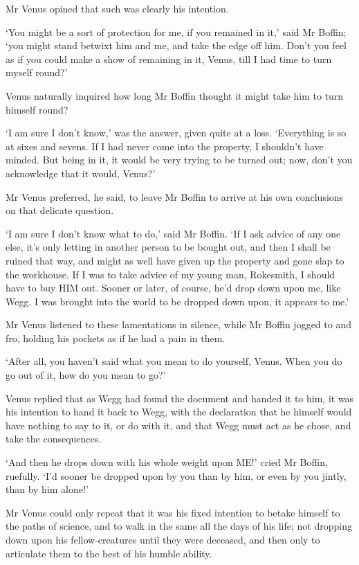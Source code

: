 Mr Venus opined that such was clearly his intention.

‘You might be a sort of protection for me, if you remained in it,’ said
Mr Boffin; ‘you might stand betwixt him and me, and take the edge off
him. Don’t you feel as if you could make a show of remaining in it,
Venus, till I had time to turn myself round?’

Venus naturally inquired how long Mr Boffin thought it might take him to
turn himself round?

‘I am sure I don’t know,’ was the answer, given quite at a loss.
‘Everything is so at sixes and sevens. If I had never come into the
property, I shouldn’t have minded. But being in it, it would be very
trying to be turned out; now, don’t you acknowledge that it would,
Venus?’

Mr Venus preferred, he said, to leave Mr Boffin to arrive at his own
conclusions on that delicate question.

‘I am sure I don’t know what to do,’ said Mr Boffin. ‘If I ask advice of
any one else, it’s only letting in another person to be bought out, and
then I shall be ruined that way, and might as well have given up the
property and gone slap to the workhouse. If I was to take advice of my
young man, Rokesmith, I should have to buy HIM out. Sooner or later, of
course, he’d drop down upon me, like Wegg. I was brought into the world
to be dropped down upon, it appears to me.’

Mr Venus listened to these lamentations in silence, while Mr Boffin
jogged to and fro, holding his pockets as if he had a pain in them.

‘After all, you haven’t said what you mean to do yourself, Venus. When
you do go out of it, how do you mean to go?’

Venus replied that as Wegg had found the document and handed it to him,
it was his intention to hand it back to Wegg, with the declaration that
he himself would have nothing to say to it, or do with it, and that Wegg
must act as he chose, and take the consequences.

‘And then he drops down with his whole weight upon ME!’ cried Mr Boffin,
ruefully. ‘I’d sooner be dropped upon by you than by him, or even by you
jintly, than by him alone!’

Mr Venus could only repeat that it was his fixed intention to betake
himself to the paths of science, and to walk in the same all the days
of his life; not dropping down upon his fellow-creatures until they were
deceased, and then only to articulate them to the best of his humble
ability.

